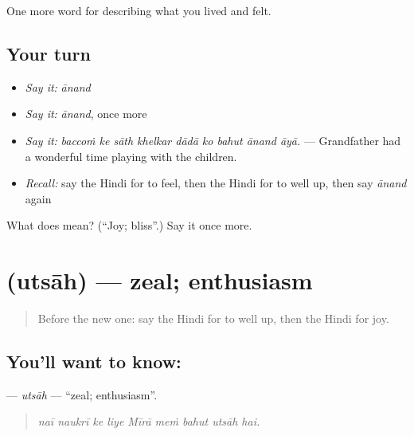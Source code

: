 \begin{grammarlens}[title={What you've built}]
One more word for describing what you lived and felt.
\end{grammarlens}

\subsection*{Your turn}
\begin{itemize}
\raggedright
  \item \emph{Say it:} \emph{ānand}
  \item \emph{Say it:} \emph{ānand}, once more
  \item \emph{Say it:} \emph{baccoṁ ke sāth khelkar dādā ko bahut ānand āyā.} — Grandfather had a wonderful time playing with the children.
  \item \emph{Recall:} say the Hindi for to feel, then the Hindi for to well up, then say \emph{ānand} again
\end{itemize}

\begin{tcolorbox}[breakable,colback=teal!4,colframe=teal!35!black,title={Before you move on}]
What does  mean? (\textquotedblleft{}Joy; bliss\textquotedblright{}.) Say it once more.
\end{tcolorbox}
\section[\texorpdfstring{\hi{उत्साह} (utsāh)}{उत्साह (utsāh)}]{ (utsāh) — zeal; enthusiasm}

\label{lesson:HI-C453-utsah}



\begin{quote}
Before the new one: say the Hindi for to well up, then the Hindi for joy.
\end{quote}

\subsection*{You'll want to know: }
\textbf{} — \emph{utsāh} — \textquotedblleft{}zeal; enthusiasm\textquotedblright{}.

\begin{quote}
        
\end{quote}

\begin{quote}
\emph{naī naukrī ke liye Mīrā meṁ bahut utsāh hai.}
\end{quote}


